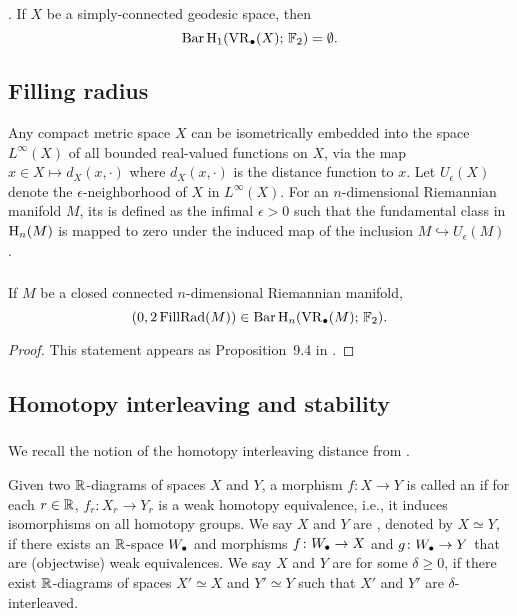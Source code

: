 \subsubsection{} \label{prop:pH1}{\rm \cite[Prop.~7.10]{virk20201}}.
If $X$ be a simply-connected geodesic space, then
\[
\operatorname{Bar} \operatorname{H}_{1}(\operatorname{VR}_\bullet(X);\,{\mathbb{F}_2}) = \emptyset.
\]

\subsection{Filling radius}\label{ss:filling_radius}

Any compact metric space $X$ can be isometrically embedded into the space $L^\infty(X)$ of all bounded real-valued functions on $X$, via the map $x\in X\mapsto d_X(x,\cdot)$ where $d_X(x,\cdot)$ is the distance function to $x$. Let $U_\epsilon(X)$ denote the $\epsilon$-neighborhood of $X$ in $L^\infty(X)$.
For an $n$-dimensional Riemannian manifold $M$, its  is defined as the infimal $\epsilon>0$ such that the fundamental class in $\operatorname{H}_n(M)$ is mapped to zero under the induced map of the inclusion $M \hookrightarrow U_\epsilon(M)$ \cite[page 108]{gromov2007metric}.

\subsubsection{}\label{prop:manifold}

\proposition If $M$ be a closed connected $n$-dimensional Riemannian manifold,
\[
(0,2\operatorname{FillRad}(M)) \in \operatorname{Bar} \operatorname{H}_{n}(\operatorname{VR}_\bullet(M);\,{\mathbb{F}_2}).
\]

\begin{proof}
	This statement appears as Proposition~9.4 in \cite{lim2020vietoris}.
\end{proof}

\subsection{Homotopy interleaving and stability}

\subsubsection{}\label{def:dhi} We recall the notion of the homotopy interleaving distance from \cite{blumberg2023interleaving}.

Given two $\mathbb{R}$-diagrams of spaces $X$ and $Y$, a morphism $f \colon X \to Y$ is called an  if for each $r \in \mathbb{R}$, $f_r \colon X_r \to Y_r$ is a weak homotopy equivalence, i.e., it induces isomorphisms on all homotopy groups.
We say $X$ and $Y$ are , denoted by $X \simeq Y$, if there exists an $\mathbb{R}$-space $W_\bullet$ and morphisms $f \colon W_\bullet \to X$ and $g \colon W_\bullet \to Y$ that are (objectwise) weak equivalences.
We say $X$ and $Y$ are  for some $\delta \geq 0$, if there exist $\mathbb{R}$-diagrams of spaces $X' \simeq X$ and $Y' \simeq Y$ such that $X'$ and $Y'$ are $\delta$-interleaved.

